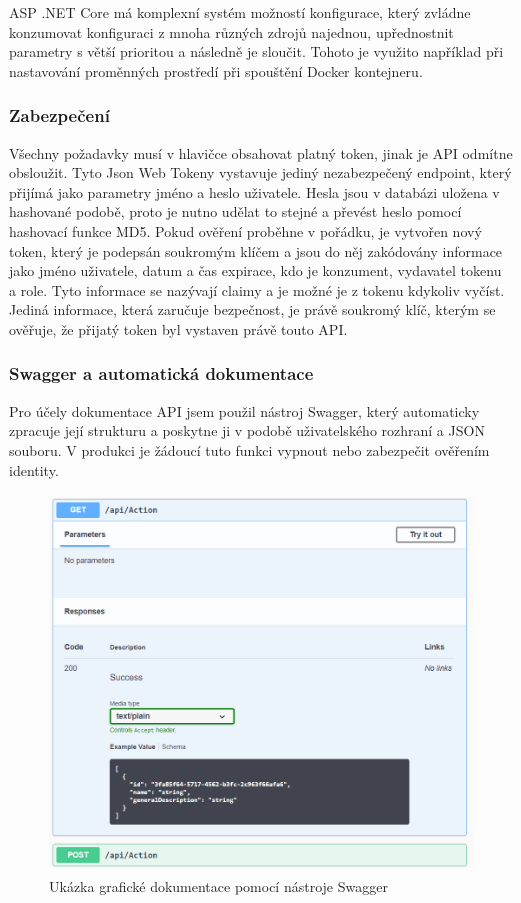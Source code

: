 \documentclass[
  biblatex,
  glossaries,
  index
]{kidiplom}
\begin{document}
ASP .NET Core má komplexní systém možností konfigurace, který zvládne konzumovat konfiguraci z mnoha různých zdrojů najednou, upřednostnit parametry s větší prioritou a následně je sloučit. Tohoto je využito například při nastavování proměnných prostředí při spouštění Docker kontejneru.

\subsubsection{Zabezpečení}
\label{sec:security}
Všechny požadavky musí v hlavičce obsahovat platný token, jinak je API odmítne obsloužit. Tyto Json Web Tokeny vystavuje jediný nezabezpečený endpoint, který přijímá jako parametry jméno a heslo uživatele. Hesla jsou v databázi uložena v hashované podobě, proto je nutno udělat to stejné a převést heslo pomocí hashovací funkce MD5. Pokud ověření proběhne v pořádku, je vytvořen nový token, který je podepsán soukromým klíčem a jsou do něj zakódovány informace jako jméno uživatele, datum a čas expirace, kdo je konzument, vydavatel tokenu a role. Tyto informace se nazývají claimy a je možné je z tokenu kdykoliv vyčíst. Jediná informace, která zaručuje bezpečnost, je právě soukromý klíč, kterým se ověřuje, že přijatý token byl vystaven právě touto API.

\subsubsection{Swagger a automatická dokumentace}
Pro účely dokumentace API jsem použil nástroj Swagger, který automaticky zpracuje její strukturu a poskytne ji v podobě uživatelského rozhraní a JSON souboru. V produkci je žádoucí tuto funkci vypnout nebo zabezpečit ověřením identity.

\begin{figure}[H]
  	\centering
 	 \includegraphics[width=14cm,height=10cm,keepaspectratio]{Swagger_UI}
 	 \caption{Ukázka grafické dokumentace pomocí nástroje Swagger}
\end{figure}
\end{document}
